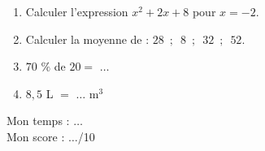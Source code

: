 \documentclass[a4paper,11pt,exos]{nsi} %
\begin{document}
\begin{enumerate}[itemsep=1em]
\\
	\item Calculer l'expression  $x^2+2x+8$ pour $x=-2$.
	\item Calculer la moyenne de :
            $28\,\,\,; \,\,\,8\,\,\,; \,\,\,32\,\,\,; \,\,\,52$.
	\item $70$ $\%$ de $20= $ $\ldots$
	\item  $8{,}5$ L $=$ $\ldots$ m$^3$
\end{enumerate}



\vspace*{1cm}
Mon temps : $\ldots$\\[.5em]
Mon score : $\ldots$/10

\newpage
{}
\maketitle
\end{document}
